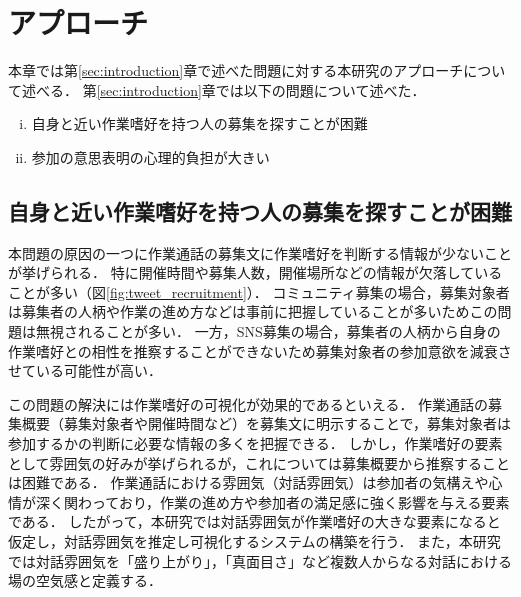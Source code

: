 \chapter{アプローチ\label{sec:approach}}
\thispagestyle{plain}

本章では第\ref{sec:introduction}章で述べた問題に対する本研究のアプローチについて述べる．
第\ref{sec:introduction}章では以下の問題について述べた．

\begin{enumerate}[i.]
    \item 自身と近い作業嗜好を持つ人の募集を探すことが困難
    \item 参加の意思表明の心理的負担が大きい
\end{enumerate}

\section{自身と近い作業嗜好を持つ人の募集を探すことが困難\label{node:approach_i}}

本問題の原因の一つに作業通話の募集文に作業嗜好を判断する情報が少ないことが挙げられる．
特に開催時間や募集人数，開催場所などの情報が欠落していることが多い（図\ref{fig:tweet_recruitment}）．
コミュニティ募集の場合，募集対象者は募集者の人柄や作業の進め方などは事前に把握していることが多いためこの問題は無視されることが多い．
一方，SNS募集の場合，募集者の人柄から自身の作業嗜好との相性を推察することができないため募集対象者の参加意欲を減衰させている可能性が高い．

この問題の解決には作業嗜好の可視化が効果的であるといえる．
作業通話の募集概要（募集対象者や開催時間など）を募集文に明示することで，募集対象者は参加するかの判断に必要な情報の多くを把握できる．
しかし，作業嗜好の要素として雰囲気の好みが挙げられるが，これについては募集概要から推察することは困難である．
作業通話における雰囲気（対話雰囲気）は参加者の気構えや心情が深く関わっており，作業の進め方や参加者の満足感に強く影響を与える要素である．
したがって，本研究では対話雰囲気が作業嗜好の大きな要素になると仮定し，対話雰囲気を推定し可視化するシステムの構築を行う．
また，本研究では対話雰囲気を「盛り上がり」，「真面目さ」など複数人からなる対話における場の空気感と定義する．

